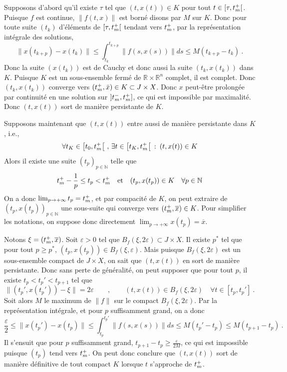 Supposons d'abord qu'il existe \(\tau\) tel que \((t,x(t))\in K\) pour
tout \(t\in [\tau,t_m^+[\). Puisque \(f\) est continue, \(\|f(t,x)\|\)
est borné disons par \(M\) sur \(K\). Donc pour toute suite \((t_k)\)
d'éléments de \([\tau,t_m^+[\) tendant vers \(t_m^+\), par la
représentation intégrale des solutions, \[
\|x(t_{k+p}) - x(t_{k}) \| \leq \int_{t_k}^{t_{k+p}} \|f(s,x(s))\| ds \leq M (t_{k+p}-t_k) \ .
\] Donc la suite \((x(t_k))\) est de Cauchy et donc aussi la suite
\((t_k,x(t_k))\) dans \(K\). Puisque \(K\) est un sous-ensemble fermé de
\(\mathbb{R}\times \mathbb{R}^n\) complet, il est complet. Donc
\((t_k,x(t_k))\) converge vers
\((t_m^+,\bar{x})\in K \subset J\times X\). Donc \(x\) peut-être
prolongée par continuité en une solution sur \(]t_m^-,t_m^+]\), ce qui
est impossible par maximalité. Donc \((t,x(t))\) sort de manière
persistante de \(K\).

Supposons maintenant que \((t,x(t))\) entre aussi de manière persistante
dans \(K\), i.e., \[
 \forall t_K \in \left[t_0,t_m^+\right[ \, , \, \exists t\in \left[t_K,t_m^+\right[ \: : \: (t,x(t))\in K
\] Alors il existe une suite \((t_p)_{p\in \mathbb{N}}\) telle que \[
t_m^+-\frac{1}{p}\leq  t_p < t_m^+\quad \text{et} \quad (t_p,x(t_p))\in K \quad \forall p\in \mathbb{N}
\] On a donc \(\lim_{p\to+\infty} t_p = t_m^+\), et par compacité de
\(K\), on peut extraire de \((t_p,x(t_p))_{p\in \mathbb{N}}\) une
sous-suite qui converge vers \((t_m^+,\overline{x})\in K\). Pour
simplifier les notations, on suppose donc directement
\(\lim_{p\to+\infty} x(t_p) =\overline{x}\).

Notons \(\xi =(t_m^+,\overline{x})\). Soit \(\varepsilon >0\) tel que
\(B_f(\xi,2\varepsilon)\subset J\times X\). Il existe \(p^*\) tel que
pour tout \(p\geq p^*\), \((t_{p},x(t_{p}))\in B_f(\xi,\varepsilon)\).
Mais puisque \(B_f(\xi,2\varepsilon)\) est un sous-ensemble compact de
\(J\times X\), on sait que \((t,x(t))\) en sort de manière persistante.
Donc sans perte de généralité, on peut supposer que pour tout \(p\), il
existe \(t_p < t_p' < t_{p+1}\) tel que \[
\| (t_p',x(t_p')) - \xi \| = 2\varepsilon  \qquad , \qquad (t,x(t))\in B_f(\xi,2\varepsilon) \quad \forall t\in [ t_p,t_p' ] \ .
\] Soit alors \(M\) le maximum de \(\| f\|\) sur le compact
\(B_f(\xi,2\varepsilon)\). Par la représentation intégrale, et pour
\(p\) suffisamment grand, on a donc \[
\frac{\varepsilon}{2} \leq \|x(t_p')-x(t_p) \| \leq \int_{t_p}^{t_p'} \|f(s,x(s))\| ds \leq M (t_p'-t_p) \leq M (t_{p+1}-t_p)  \ .
\] Il s'ensuit que pour \(p\) suffisamment grand,
\(t_{p+1}-t_p \geq \frac{\varepsilon}{2M}\), ce qui est impossible
puisque \((t_p)\) tend vers \(t_m^+\). On peut donc conclure que
\((t,x(t))\) sort de manière définitive de tout compact \(K\) lorsque
\(t\) s'approche de \(t_m^+\).

